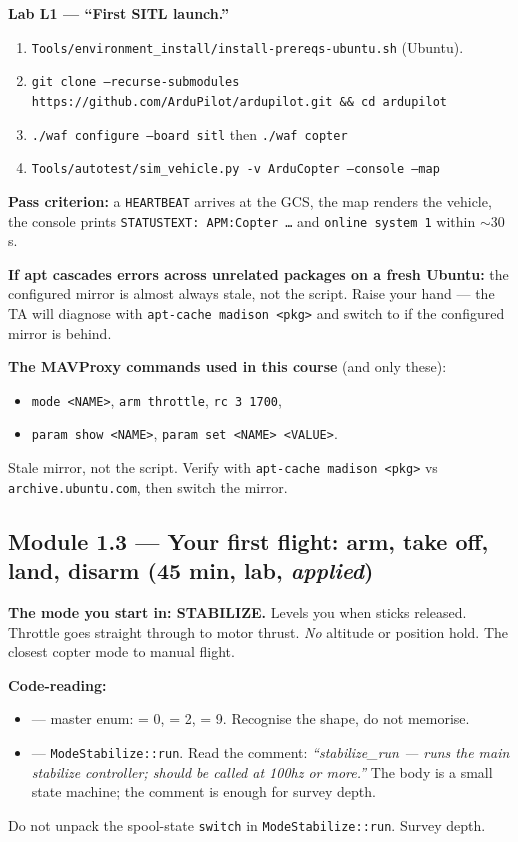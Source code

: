\documentclass[a4paper,11pt,twoside]{article}
\renewcommand{\instnote}[1]{\ifinstructor\begin{tcolorbox}[colback=blue!4!white,colframe=blue!40!black,title=Instructor note,breakable]#1\end{tcolorbox}\fi}
\renewcommand{\instfaq}[2]{\ifinstructor\begin{tcolorbox}[colback=green!4!white,colframe=green!40!black,title=Anticipated Q: #1,breakable]#2\end{tcolorbox}\fi}
\begin{document}
\textbf{Lab L1 --- ``First SITL launch.''}
\begin{enumerate}
  \item \texttt{Tools/environment\_install/install-prereqs-ubuntu.sh} (Ubuntu).
  \item \texttt{git clone --recurse-submodules https://github.com/ArduPilot/ardupilot.git \&\& cd ardupilot}
  \item \texttt{./waf configure --board sitl} \quad then \quad \texttt{./waf copter}
  \item \texttt{Tools/autotest/sim\_vehicle.py -v ArduCopter --console --map}
\end{enumerate}
\textbf{Pass criterion:} a \texttt{HEARTBEAT} arrives at the GCS, the map renders the vehicle, the console prints \texttt{STATUSTEXT: APM:Copter \dots} and \texttt{online system 1} within $\sim$30 s.

\textbf{If apt cascades errors across unrelated packages on a fresh Ubuntu:} the configured mirror is almost always stale, not the script. Raise your hand --- the TA will diagnose with \texttt{apt-cache madison <pkg>} and switch  to  if the configured mirror is behind.

\textbf{The MAVProxy commands used in this course} (and only these):
\begin{itemize}
  \item \texttt{mode <NAME>}, \texttt{arm throttle}, \texttt{rc 3 1700},
  \item \texttt{param show <NAME>}, \texttt{param set <NAME> <VALUE>}.
\end{itemize}

\instfaq{Build fails on a fresh Ubuntu 26.04 with cascading apt errors.}{Stale mirror, not the script. Verify with \texttt{apt-cache madison <pkg>} vs \texttt{archive.ubuntu.com}, then switch the mirror.}

\subsection{Module 1.3 --- Your first flight: arm, take off, land, disarm (45 min, lab, \emph{applied})}

\textbf{The mode you start in: STABILIZE.} Levels you when sticks released. Throttle goes straight through to motor thrust. \emph{No} altitude or position hold. The closest copter mode to manual flight.

\textbf{Code-reading:}
\begin{itemize}
  \item {} --- master enum:  = 0,  = 2,  = 9. Recognise the shape, do not memorise.
  \item {} --- \texttt{ModeStabilize::run}. Read the comment: \emph{``stabilize\_run --- runs the main stabilize controller; should be called at 100hz or more.''} The body is a small state machine; the comment is enough for survey depth.
\end{itemize}
\instnote{Do not unpack the spool-state \texttt{switch} in \texttt{ModeStabilize::run}. Survey depth.}
\end{document}
